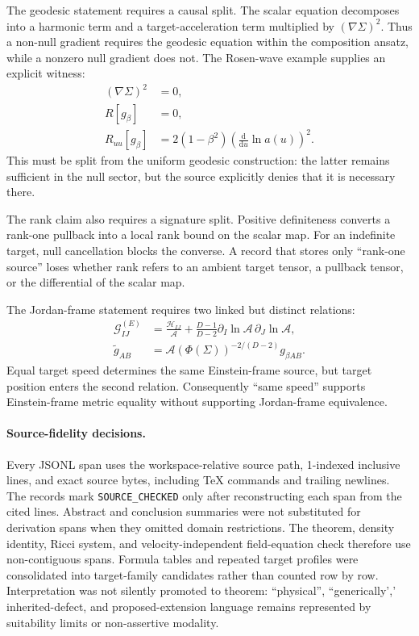The geodesic statement requires a causal split. The scalar equation decomposes into a harmonic term and a target-acceleration term multiplied by $(\nabla\Sigma)^2$. Thus a non-null gradient requires the geodesic equation within the composition ansatz, while a nonzero null gradient does not. The Rosen-wave example supplies an explicit witness:
\begin{align}
(\nabla\Sigma)^2&=0,\\
R[g_\beta]&=0,\\
R_{uu}[g_\beta]
&=2(1-\beta^2)\left(\frac{\mathrm d}{\mathrm d u}\ln a(u)\right)^2.
\end{align}
This must be split from the uniform geodesic construction: the latter remains sufficient in the null sector, but the source explicitly denies that it is necessary there.

The rank claim also requires a signature split. Positive definiteness converts a rank-one pullback into a local rank bound on the scalar map. For an indefinite target, null cancellation blocks the converse. A record that stores only ``rank-one source'' loses whether rank refers to an ambient target tensor, a pullback tensor, or the differential of the scalar map.

The Jordan-frame statement requires two linked but distinct relations:
\begin{align}
\mathcal G^{(E)}_{IJ}
&=\frac{\mathcal H_{IJ}}{\mathcal A}
 +\frac{D-1}{D-2} \partial_I\ln\mathcal A\,\partial_J\ln\mathcal A,\\
\widetilde g_{AB}
&=\mathcal A(\Phi(\Sigma))^{-2/(D-2)}g_{\beta AB}.
\end{align}
Equal target speed determines the same Einstein-frame source, but target position enters the second relation. Consequently ``same speed'' supports Einstein-frame metric equality without supporting Jordan-frame equivalence.

\paragraph{Source-fidelity decisions.}
Every JSONL span uses the workspace-relative source path, 1-indexed inclusive lines, and exact source bytes, including TeX commands and trailing newlines. The records mark \texttt{SOURCE\_CHECKED} only after reconstructing each span from the cited lines. Abstract and conclusion summaries were not substituted for derivation spans when they omitted domain restrictions. The theorem, density identity, Ricci system, and velocity-independent field-equation check therefore use non-contiguous spans. Formula tables and repeated target profiles were consolidated into target-family candidates rather than counted row by row. Interpretation was not silently promoted to theorem: ``physical'', ``generically',' inherited-defect, and proposed-extension language remains represented by suitability limits or non-assertive modality.

